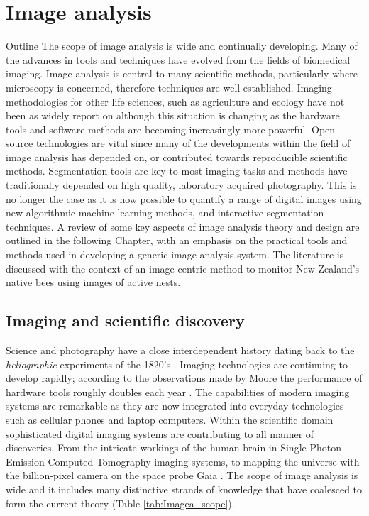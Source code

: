 \chapter{Image analysis}\label{sec:image-analysis}
\begin{remark}{Outline}
The scope of image analysis is wide and continually developing. Many of the advances in tools and techniques have evolved from the fields of biomedical imaging. Image analysis is central to many scientific methods, particularly where microscopy is concerned, therefore techniques are well established. Imaging methodologies for other life sciences, such as agriculture and ecology have not been as widely report on although this situation is changing as the hardware tools and software methods are becoming increasingly more powerful. Open source technologies are vital since many of the developments within the field of image analysis has depended on, or contributed towards reproducible scientific methods. Segmentation tools are key to most imaging tasks and methods have traditionally depended on high quality, laboratory acquired photography. This is no longer the case as it is now possible to quantify a range of digital images using new algorithmic machine learning methods, and interactive segmentation techniques. A review of some key aspects of image analysis theory and design are outlined in the following Chapter, with an emphasis on the practical tools and methods used in developing a generic image analysis system. The literature is discussed with the context of an image-centric method to monitor New Zealand's native bees using images of active nests.
\end{remark}

\section{Imaging and scientific discovery}\label{sec:imaging-and-scientific-discovery}
Science and photography have a close interdependent history dating back to the \emph{heliographic} experiments of the 1820's \cite{Delaney2008}. Imaging technologies are continuing to develop rapidly; according to the observations made by Moore the performance of hardware tools roughly doubles each year \cite{Bell2009}. The capabilities of modern imaging systems are remarkable as they are now integrated into everyday technologies such as cellular phones and laptop computers. Within the scientific domain sophisticated digital imaging systems are contributing to all manner of discoveries. From the intricate workings of the human brain in Single Photon Emission Computed Tomography imaging systems, \cite{Amen2011} to mapping the universe with the billion-pixel camera on the space probe Gaia \cite{Mignard2007}. The scope of image analysis is wide and it includes many distinctive strands of knowledge that have coalesced to form the current theory (Table \ref{tab:Imagea_scope}).


